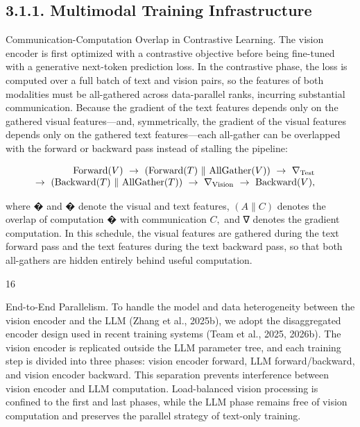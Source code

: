 \documentclass[
  10
]{article}
\begin{document}
\subsection{3.1.1. Multimodal Training
Infrastructure}\label{multimodal-training-infrastructure}

Communication-Computation Overlap in Contrastive Learning. The vision
encoder is first optimized with a contrastive objective before being
fine-tuned with a generative next-token prediction loss. In the
contrastive phase, the loss is computed over a full batch of text and
vision pairs, so the features of both modalities must be all-gathered
across data-parallel ranks, incurring substantial communication. Because
the gradient of the text features depends only on the gathered visual
features---and, symmetrically, the gradient of the visual features
depends only on the gathered text features---each all-gather can be
overlapped with the forward or backward pass instead of stalling the
pipeline:

\[
\begin{array} { r l } { \mathrm { F o r w a r d } ( V ) ~ \to ~ \left( \mathrm { F o r w a r d } ( T ) ~ \lVert ~ \mathrm { A l l G a t h e r } ( V ) \right) ~ \to ~ \nabla _ { \mathrm { T e s t } } } & { } \\ { \to ~ \left( \mathrm { B a c k w a r d } ( T ) ~ \lVert ~ \mathrm { A l l G a t h e r } ( T ) \right) ~ \to ~ \nabla _ { \mathrm { V i s i o n } } ~ \to ~ \mathrm { B a c k w a r d } ( V ) , } \end{array}
\]

where � and � denote the visual and text features,
\(\left( A \parallel C \right)\) denotes the overlap of computation �
with communication \(C ,\) and ∇ denotes the gradient computation. In
this schedule, the visual features are gathered during the text forward
pass and the text features during the text backward pass, so that both
all-gathers are hidden entirely behind useful computation.

16

End-to-End Parallelism. To handle the model and data heterogeneity
between the vision encoder and the LLM (Zhang et al., 2025b), we adopt
the disaggregated encoder design used in recent training systems (Team
et al., 2025, 2026b). The vision encoder is replicated outside the LLM
parameter tree, and each training step is divided into three phases:
vision encoder forward, LLM forward/backward, and vision encoder
backward. This separation prevents interference between vision encoder
and LLM computation. Load-balanced vision processing is confined to the
first and last phases, while the LLM phase remains free of vision
computation and preserves the parallel strategy of text-only training.
\end{document}
